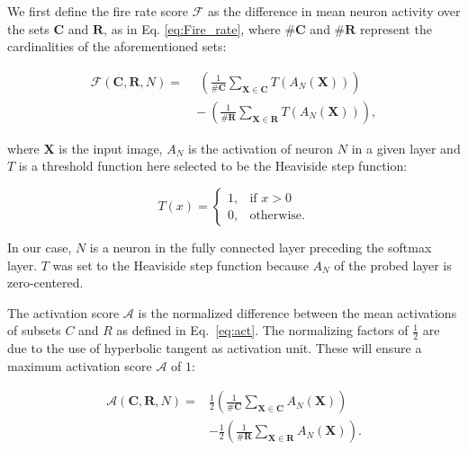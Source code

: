 \documentclass[10pt,journal,letterpaper,compsoc]{IEEEtran}
\begin{document}
We first define the fire rate score $\mathcal{F}$ as the difference in mean neuron activity over the sets $\mathbf{C}$ and $\mathbf{R}$, as in Eq. \ref{eq:Fire_rate}, where $\#\mathbf{C}$ and $\#\mathbf{R}$ represent the cardinalities of the aforementioned sets:


\begin{equation}
\begin{split}
\mathcal{F}(\mathbf{C},\mathbf{R},N)  = ~&~  \left (\frac{1}{\#\mathbf{C}} \sum_{\mathbf{X}\in \mathbf{C}}^{} T( A_{N}(\mathbf{X})) \right)  \\
 & - \>   \left (\frac{1}{\#\mathbf{R}} \sum_{\mathbf{X}\in \mathbf{R}}^{} T( A_{N}(\mathbf{X})) \right),  
\end{split}
\label{eq:Fire_rate}    
\end{equation}


where $\mathbf{X}$ is the input image, $A_{N}$ is the activation of neuron $N$ in a given layer and $T$ is a threshold function here selected to be the Heaviside step function:

\begin{equation}
        T(x)=
\begin{cases}
    1,& \text{if } x > 0\\
    0,              & \text{otherwise}.
\end{cases}
\label{eq:tr}
\end{equation}

In our case, $N$ is a neuron in the fully connected layer preceding the softmax layer. $T$ was set to the Heaviside step function because $A_{N}$ of the probed layer is zero-centered.

The activation score $\mathcal{A}$ is the normalized difference between the mean activations of subsets $C$ and $R$ as defined in Eq.~\ref{eq:act}. The normalizing factors of $\frac{1}{2}$ are due to the use of hyperbolic tangent as activation unit. These will ensure a maximum activation score $\mathcal{A}$  of $1$:

\begin{equation}
\begin{split}
\mathcal{A}(\mathbf{C},\mathbf{R},N)   = &  \frac{1}{2}  \left (\frac{1}{\#\mathbf{C}} \sum_{\mathbf{X}\in \mathbf{C}}^{}  A_{N}(\mathbf{X}) \right) \\
&-  \frac{1}{2}  \left (\frac{1}{\#\mathbf{R}} \sum_{\mathbf{X}\in \mathbf{R}}^{}  A_{N}(\mathbf{X}) \right).
\end{split}
\label{eq:act}
\end{equation}
\end{document}
